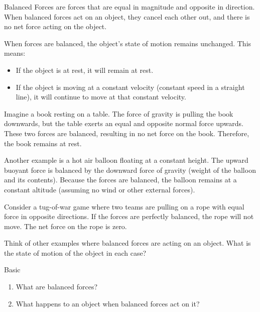 \begin{keyconcept}{Balanced Forces}
 are forces that are equal in magnitude and opposite in direction. When balanced forces act on an object, they cancel each other out, and there is no net force acting on the object.
\end{keyconcept}

When forces are balanced, the object's state of motion remains unchanged.  This means:

\begin{itemize}
    \item If the object is at rest, it will remain at rest.
    \item If the object is moving at a constant velocity (constant speed in a straight line), it will continue to move at that constant velocity.
\end{itemize}

Imagine a book resting on a table.  The force of gravity is pulling the book downwards, but the table exerts an equal and opposite normal force upwards.  These two forces are balanced, resulting in no net force on the book.  Therefore, the book remains at rest.

Another example is a hot air balloon floating at a constant height. The upward buoyant force is balanced by the downward force of gravity (weight of the balloon and its contents).  Because the forces are balanced, the balloon remains at a constant altitude (assuming no wind or other external forces).

\begin{example}
Consider a tug-of-war game where two teams are pulling on a rope with equal force in opposite directions. If the forces are perfectly balanced, the rope will not move.  The net force on the rope is zero.
\end{example}

\begin{stopandthink}
Think of other examples where balanced forces are acting on an object. What is the state of motion of the object in each case?
\end{stopandthink}

\begin{tieredquestions}{Basic}
\begin{enumerate}
    \item What are balanced forces?
    \item What happens to an object when balanced forces act on it?
\end{enumerate}
\end{tieredquestions}


